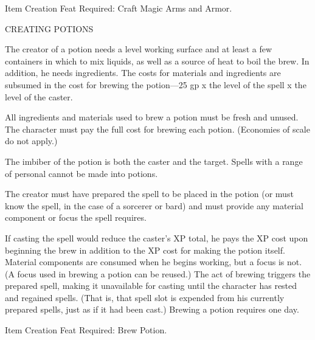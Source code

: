 Item Creation Feat Required: Craft Magic Arms and Armor.

\vspace{12pt}
{\large CREATING POTIONS}

The creator of a potion needs a level working surface and at least a few containers 
in which to mix liquids, as well as a source of heat to boil the brew. In addition, 
he needs ingredients. The costs for materials and ingredients are subsumed in the 
cost for brewing the potion---25 gp x$ $ the level of the spell x $ $the level 
of the caster.

All ingredients and materials used to brew a potion must be fresh and unused. The 
character must pay the full cost for brewing each potion. (Economies of scale do 
not apply.)

The imbiber of the potion is both the caster and the target. Spells with a range 
of personal cannot be made into potions.

The creator must have prepared the spell to be placed in the potion (or must know 
the spell, in the case of a sorcerer or bard) and must provide any material component 
or focus the spell requires.

If casting the spell would reduce the caster's XP total, he pays the XP cost upon 
beginning the brew in addition to the XP cost for making the potion itself. Material 
components are consumed when he begins working, but a focus is not. (A focus used 
in brewing a potion can be reused.) The act of brewing triggers the prepared spell, 
making it unavailable for casting until the character has rested and regained spells. 
(That is, that spell slot is expended from his currently prepared spells, just 
as if it had been cast.) Brewing a potion requires one day.

Item Creation Feat Required: Brew Potion.

